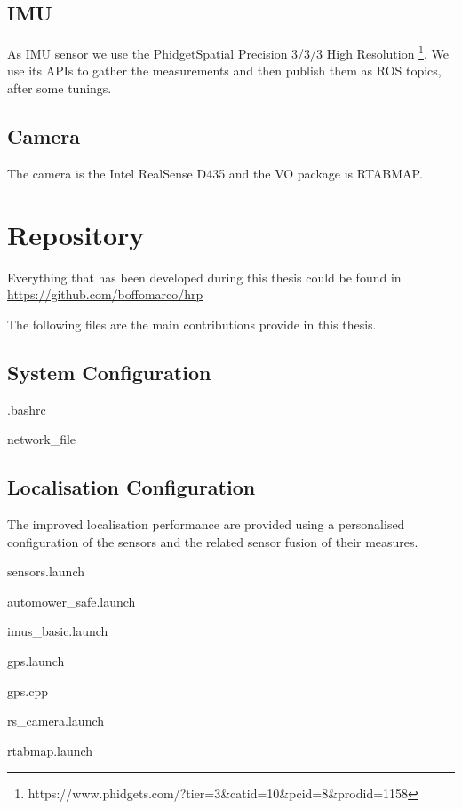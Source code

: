 {\section{IMU}

\noindent
As IMU sensor we use the PhidgetSpatial Precision 3/3/3 High Resolution \footnote{https://www.phidgets.com/?tier=3\&catid=10\&pcid=8\&prodid=1158}.
We use its APIs to gather the measurements and then publish them as ROS topics, after some tunings.

\section{Camera}

\noindent The camera is the Intel RealSense D435 and the \gls{VO} package is \gls{RTABMAP}.

}

\chapter{Repository}
\noindent
Everything that has been developed during this thesis could be found in \url{https://github.com/boffomarco/hrp}

The following files are the main contributions provide in this thesis.

\section{System Configuration}
\noindent


.bashrc

network\_file

\section{Localisation Configuration}
\noindent The improved localisation performance are provided using a personalised configuration of the sensors and the related sensor fusion of their measures.

sensors.launch

automower\_safe.launch

imus\_basic.launch

gps.launch

gps.cpp

rs\_camera.launch

rtabmap.launch

